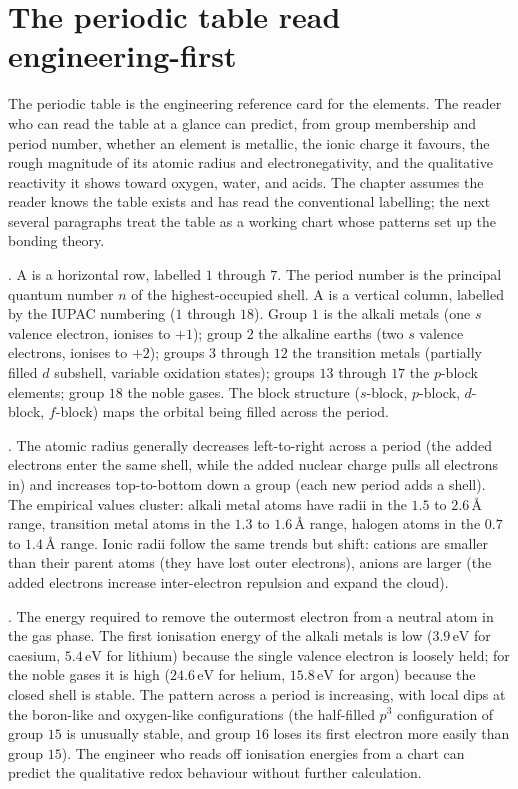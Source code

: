 \section{The periodic table read engineering-first}

The periodic table is the engineering reference card for the elements.
The reader who can read the table at a glance can predict, from group
membership and period number, whether an element is metallic, the
ionic charge it favours, the rough magnitude of its atomic radius and
electronegativity, and the qualitative reactivity it shows toward
oxygen, water, and acids. The chapter assumes the reader knows the
table exists and has read the conventional labelling; the next several
paragraphs treat the table as a working chart whose patterns set up
the bonding theory.

. A  is a horizontal row,
labelled $1$ through $7$. The period number is the principal quantum
number $n$ of the highest-occupied shell. A  is a
vertical column, labelled by the IUPAC numbering ($1$ through $18$).
Group $1$ is the alkali metals (one $s$ valence electron, ionises to
$+1$); group $2$ the alkaline earths (two $s$ valence electrons,
ionises to $+2$); groups $3$ through $12$ the transition metals
(partially filled $d$ subshell, variable oxidation states); groups
$13$ through $17$ the $p$-block elements; group $18$ the noble gases.
The block structure ($s$-block, $p$-block, $d$-block, $f$-block) maps
the orbital being filled across the period.

. The atomic radius generally
decreases left-to-right across a period (the added electrons enter the
same shell, while the added nuclear charge pulls all electrons in) and
increases top-to-bottom down a group (each new period adds a shell).
The empirical values cluster: alkali metal atoms have radii in the
$1.5$ to $2.6\,\si{\angstrom}$ range, transition metal atoms in the
$1.3$ to $1.6\,\si{\angstrom}$ range, halogen atoms in the $0.7$ to
$1.4\,\si{\angstrom}$ range. Ionic radii follow the same trends but
shift: cations are smaller than their parent atoms (they have lost
outer electrons), anions are larger (the added electrons increase
inter-electron repulsion and expand the cloud).

. The energy required to remove the
outermost electron from a neutral atom in the gas phase. The first
ionisation energy of the alkali metals is low ($3.9\,\text{eV}$ for
caesium, $5.4\,\text{eV}$ for lithium) because the single valence
electron is loosely held; for the noble gases it is high ($24.6\,
\text{eV}$ for helium, $15.8\,\text{eV}$ for argon) because the closed
shell is stable. The pattern across a period is increasing, with local
dips at the boron-like and oxygen-like configurations (the half-filled
$p^3$ configuration of group $15$ is unusually stable, and group $16$
loses its first electron more easily than group $15$). The engineer
who reads off ionisation energies from a chart can predict the
qualitative redox behaviour without further calculation.

